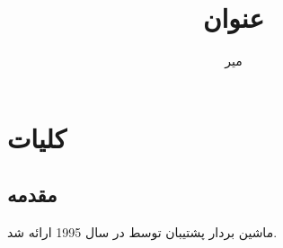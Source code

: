 \documentclass[10pt,a4paper]{report}
\title{عنوان}
\author{میر}
\begin{document}





\tableofcontents

\chapter{کلیات}
\section{مقدمه}
ماشین بردار پشتیبان توسط  در سال 1995 ارائه شد.


\newpage
\end{document}
